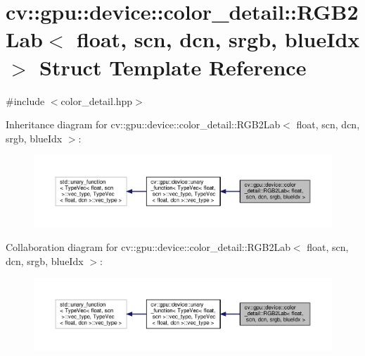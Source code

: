 \hypertarget{structcv_1_1gpu_1_1device_1_1color__detail_1_1RGB2Lab_3_01float_00_01scn_00_01dcn_00_01srgb_00_01blueIdx_01_4}{\section{cv\-:\-:gpu\-:\-:device\-:\-:color\-\_\-detail\-:\-:R\-G\-B2\-Lab$<$ float, scn, dcn, srgb, blue\-Idx $>$ Struct Template Reference}
\label{structcv_1_1gpu_1_1device_1_1color__detail_1_1RGB2Lab_3_01float_00_01scn_00_01dcn_00_01srgb_00_01blueIdx_01_4}
}


{\ttfamily \#include $<$color\-\_\-detail.\-hpp$>$}



Inheritance diagram for cv\-:\-:gpu\-:\-:device\-:\-:color\-\_\-detail\-:\-:R\-G\-B2\-Lab$<$ float, scn, dcn, srgb, blue\-Idx $>$\-:\nopagebreak
\begin{figure}[H]
\begin{center}
\leavevmode
\includegraphics[width=350pt]{structcv_1_1gpu_1_1device_1_1color__detail_1_1RGB2Lab_3_01float_00_01scn_00_01dcn_00_01srgb_00_01blueIdx_01_4__inherit__graph}
\end{center}
\end{figure}


Collaboration diagram for cv\-:\-:gpu\-:\-:device\-:\-:color\-\_\-detail\-:\-:R\-G\-B2\-Lab$<$ float, scn, dcn, srgb, blue\-Idx $>$\-:\nopagebreak
\begin{figure}[H]
\begin{center}
\leavevmode
\includegraphics[width=350pt]{structcv_1_1gpu_1_1device_1_1color__detail_1_1RGB2Lab_3_01float_00_01scn_00_01dcn_00_01srgb_00_01blueIdx_01_4__coll__graph}
\end{center}
\end{figure}
